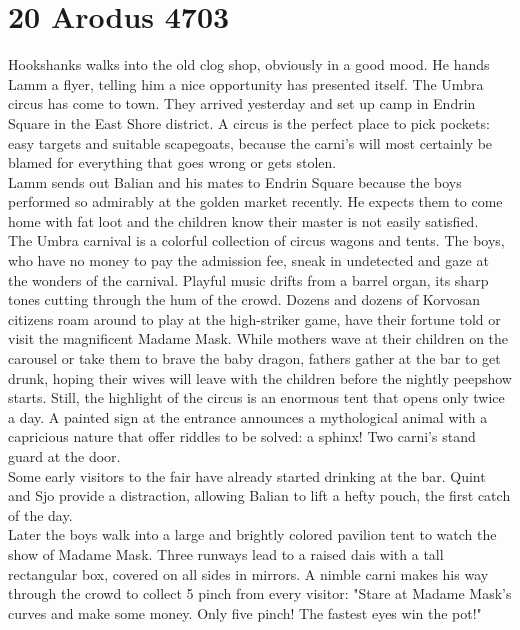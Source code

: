\section{20 Arodus 4703}

Hookshanks walks into the old clog shop, obviously in a good mood. He hands Lamm a flyer, telling him a nice opportunity has presented itself. The Umbra circus has come to town. They arrived yesterday and set up camp in Endrin Square in the East Shore district. A circus is the perfect place to pick pockets: easy targets and suitable scapegoats, because the carni's will most certainly be blamed for everything that goes wrong or gets stolen.\\

Lamm sends out Balian and his mates to Endrin Square because the boys performed so admirably at the golden market recently. He expects them to come home with fat loot and the children know their master is not easily satisfied.\\

The Umbra carnival is a colorful collection of circus wagons and tents. The boys, who have no money to pay the admission fee, sneak in undetected and gaze at the wonders of the carnival. Playful music drifts from a barrel organ, its sharp tones cutting through the hum of the crowd. Dozens and dozens of Korvosan citizens roam around to play at the high-striker game, have their fortune told or visit the magnificent Madame Mask. While mothers wave at their children on the carousel or take them to brave the baby dragon, fathers gather at the bar to get drunk, hoping their wives will leave with the children before the nightly peepshow starts. Still, the highlight of the circus is an enormous tent that opens only twice a day. A painted sign at the entrance announces a mythological animal with a capricious nature that offer riddles to be solved: a sphinx! Two carni's stand guard at the door.\\

Some early visitors to the fair have already started drinking at the bar. Quint and Sjo provide a distraction, allowing Balian to lift a hefty pouch, the first catch of the day.\\

Later the boys walk into a large and brightly colored pavilion tent to watch the show of Madame Mask. Three runways lead to a raised dais with a tall rectangular box, covered on all sides in mirrors. A nimble carni makes his way through the crowd to collect 5 pinch from every visitor: "Stare at Madame Mask's curves and make some money. Only five pinch! The fastest eyes win the pot!"\\

